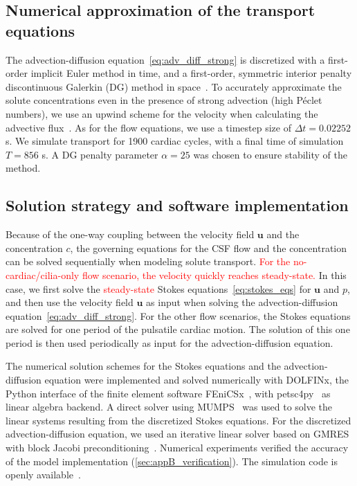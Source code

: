 \documentclass[fleqn]{wlscirep}
\newcommand{\uu}{\mathbf{u}}
\newcommand{\fixme}[1]{\textcolor{red}{#1}}
\begin{document}
\subsection*{Numerical approximation of the transport equations}
The advection-diffusion equation~\eqref{eq:adv_diff_strong} is discretized with a first-order implicit Euler method in time, and a first-order, symmetric interior penalty discontinuous Galerkin (DG) method in space~\cite{Arnold1982AnElements}. To accurately approximate the solute concentrations even in the presence of strong advection (high Péclet numbers), we use an upwind scheme for the velocity when calculating the advective flux~\cite{Patankar2018NumericalFlow}. As for the flow equations, we use a timestep size of $\Delta t = 0.02252$ s. We simulate transport for 1900 cardiac cycles, with a final time of simulation $T = 856$ s. A DG penalty parameter $\alpha = 25$ was chosen to ensure stability of the method. 

\subsection*{Solution strategy and software implementation}
Because of the one-way coupling between the velocity field $\uu$ and the concentration $c$, the governing equations for the CSF flow and the concentration can be solved sequentially when modeling solute transport. \fixme{For the no-cardiac/cilia-only flow scenario, the velocity quickly reaches steady-state.} In this case, we first solve the \fixme{steady-state} Stokes equations~\eqref{eq:stokes_eqs} for $\uu$ and $p$, and then use the velocity field $\uu$ as input when solving the advection-diffusion equation~\eqref{eq:adv_diff_strong}. For the other flow scenarios, the Stokes equations are solved for one period of the pulsatile cardiac motion. The solution of this one period is then used periodically as input for the advection-diffusion equation.

The numerical solution schemes for the Stokes equations and the advection-diffusion equation were implemented and solved numerically with DOLFINx, the Python interface of the finite element software FEniCSx~\cite{TheFEniCSProject2024FEniCSxDocumentation}, with petsc4py~\cite{Dalcin2011ParallelPython} as linear algebra backend. A direct solver using MUMPS~\cite{Amestoy2011Mumps} was used to solve the linear systems resulting from the discretized Stokes equations. For the discretized advection-diffusion equation, we used an iterative linear solver based on GMRES~\cite{Saad1986GMRES:Systems} with block Jacobi preconditioning~\cite{Jacobi1845UeberGleichungen}. Numerical experiments verified the accuracy of the model implementation (\cref{sec:appB_verification}). The simulation code is openly available~\cite{zenodo-link-to-all-code}. 
\end{document}
